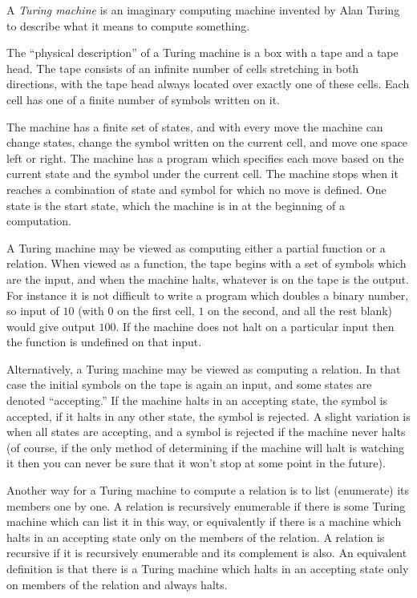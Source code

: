 \documentclass[12pt]{article}
\begin{document}
A \emph{Turing machine} is an imaginary computing machine invented by Alan Turing to describe what it means to compute something.

The ``physical description'' of a Turing machine is a box with a tape and a tape head.  The tape consists of an infinite number of cells stretching in both directions, with the tape head always located over exactly one of these cells.  Each cell has one of a finite number of symbols written on it.

The machine has a finite set of states, and with every move the machine can change states, change the symbol written on the current cell, and move one space left or right.  The machine has a program which specifies each move based on the current state and the symbol under the current cell.  The machine stops when it reaches a combination of state and symbol for which no move is defined.  One state is the start state, which the machine is in at the beginning of a computation.

A Turing machine may be viewed as computing either a partial function or a relation.  When viewed as a function, the tape begins with a set of symbols which are the input, and when the machine halts, whatever is on the tape is the output.  For instance it is not difficult to write a program which doubles a binary number, so input of $10$ (with $0$ on the first cell, $1$ on the second, and all the rest blank) would give output $100$.  If the machine does not halt on a particular input then the function is undefined on that input.

Alternatively, a Turing machine may be viewed as computing a relation.  In that case the initial symbols on the tape is again an input, and some states are denoted ``accepting.''  If the machine halts in an accepting state, the symbol is accepted, if it halts in any other state, the symbol is rejected.  A slight variation is when all states are accepting, and a symbol is rejected if the machine never halts (of course, if the only method of determining if the machine will halt is watching it then you can never be sure that it won't stop at some point in the future).

Another way for a Turing machine to compute a relation is to list (enumerate) its members one by one.  A relation is recursively enumerable if there is some Turing machine which can list it in this way, or equivalently if there is a machine which halts in an accepting state only on the members of the relation.  A relation is recursive if it is recursively enumerable and its complement is also.  An equivalent definition is that there is a Turing machine which halts in an accepting state only on members of the relation and always halts.
\end{document}
